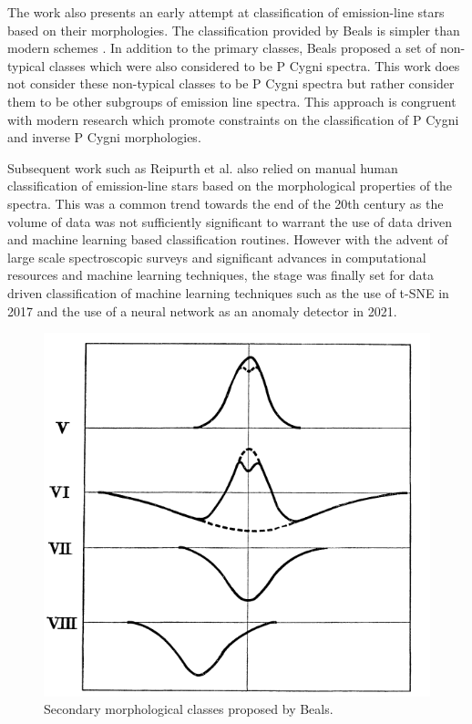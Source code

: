 The work also presents an early attempt at classification of emission-line stars based on their morphologies. The classification provided by Beals is simpler than modern schemes \cite{reipurth1996halpha}. In addition to the primary classes, Beals proposed a set of non-typical classes which were also considered to be P Cygni spectra. This work does not consider these non-typical classes to be P Cygni spectra but rather consider them to be other subgroups of emission line spectra. This approach is congruent with modern research \cite{vcotar2021galah}\cite{zhang2021catalog}\cite{reipurth1996halpha} which promote constraints on the classification of P Cygni and inverse P Cygni morphologies. 

Subsequent work such as Reipurth et al. \cite{reipurth1996halpha} also relied on manual human classification of emission-line stars based on the morphological properties of the spectra. This was a common trend towards the end of the 20th century as the volume of data was not sufficiently significant to warrant the use of data driven and machine learning based classification routines. However with the advent of large scale spectroscopic surveys and significant advances in computational resources and machine learning techniques, the stage was finally set for data driven classification of machine learning techniques such as the use of t-SNE in 2017 \cite{traven2017galah} and the use of a neural network as an anomaly detector in 2021\cite{vcotar2021galah}.

\begin{figure}[!htb]
\centering
\includegraphics[scale=.50]{figures/beals class 2.png}
\caption{Secondary morphological classes proposed by Beals.}
\end{figure}

